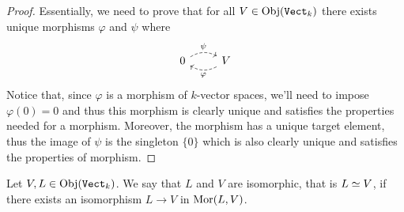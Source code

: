 \begin{proof}
    Essentially, we need to prove that for all \(V \in \operatorname{Obj}({\texttt{Vect}}_k)\) there
    exists unique morphisms \(\varphi\) and \(\psi\) where
    \[
        \begin{tikzcd}
            0
            \ar[r, bend left, dashed, "\psi"]
            &V
            \ar[l, bend left, dashed, "\varphi"]
        \end{tikzcd}
    \]
    Notice that, since \(\varphi\) is a morphism of \(k\)-vector spaces, we'll
    need to impose \(\varphi(0) = 0\) and thus this morphism is clearly unique
    and satisfies the properties needed for a morphism. Moreover, the morphism
    has a unique target element, thus the image of \(\psi\) is the singleton
    \(\{0\}\) which is also clearly unique and satisfies the properties of
    morphism.
\end{proof}

\begin{definition}[Isomorphism]
    Let \(V, L \in \operatorname{Obj}({\texttt{Vect}}_k)\). We say that \(L\) and \(V\) are
    isomorphic, that is \(L \simeq V\), if there exists an isomorphism \(L \to V\)
    in \(\operatorname{Mor}(L, V)\).
\end{definition}

